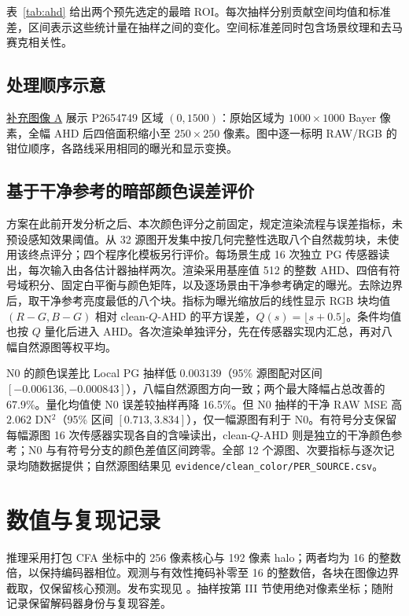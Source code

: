 \documentclass[10pt,twocolumn,journal]{IEEEtran}
\begin{document}
表~\ref{tab:ahd} 给出两个预先选定的最暗 ROI。每次抽样分别贡献空间均值和标准差，区间表示这些统计量在抽样之间的变化。空间标准差同时包含场景纹理和去马赛克相关性。



\subsection{处理顺序示意}
\href{visual_zh.pdf}{补充图像 A} 展示 P2654749 区域 $(0,1500)$：原始区域为 $1000\times1000$ Bayer 像素，全幅 AHD 后四倍面积缩小至 $250\times250$ 像素。图中逐一标明 RAW/RGB 的钳位顺序，各路线采用相同的曝光和显示变换。

\subsection{基于干净参考的暗部颜色误差评价}\label{sec:cleanendpoint}
方案在此前开发分析之后、本次颜色评分之前固定，规定渲染流程与误差指标，未预设感知效果阈值。从 32 源图开发集中按几何完整性选取八个自然裁剪块，未使用该终点评分；四个程序化模板另行评价。每场景生成 16 次独立 PG 传感器读出，每次输入由各估计器抽样两次。渲染采用基座值 512 的整数 AHD、四倍有符号域积分、固定白平衡与颜色矩阵，以及逐场景由干净参考确定的曝光。去除边界后，取干净参考亮度最低的八个块。指标为曝光缩放后的线性显示 RGB 块均值 $(R-G,B-G)$ 相对 clean-$Q$-AHD 的平方误差，$Q(s)=\lfloor s+0.5\rfloor$。条件均值也按 $Q$ 量化后进入 AHD。各次渲染单独评分，先在传感器实现内汇总，再对八幅自然源图等权平均。



N0 的颜色误差比 Local PG 抽样低 $0.003139$（95\% 源图配对区间 $[-0.006136,-0.000843]$），八幅自然源图方向一致；两个最大降幅占总改善的 67.9\%。量化均值使 N0 误差较抽样再降 16.5\%。但 N0 抽样的干净 RAW MSE 高 $2.062$ DN$^2$（95\% 区间 $[0.713,3.834]$），仅一幅源图有利于 N0。有符号分支保留每幅源图 16 次传感器实现各自的含噪读出，clean-$Q$-AHD 则是独立的干净颜色参考；N0 与有符号分支的颜色差值区间跨零。全部 12 个源图、次要指标与逐次记录均随数据提供；自然源图结果见 \texttt{evidence/clean\_color/}\allowbreak\texttt{PER\_SOURCE.csv}。

\section{数值与复现记录}
推理采用打包 CFA 坐标中的 256 像素核心与 192 像素 halo；两者均为 16 的整数倍，以保持编码器相位。观测与有效性掩码补零至 16 的整数倍，各块在图像边界截取，仅保留核心预测。发布实现见 。抽样按第 III 节使用绝对像素坐标；随附记录保留解码器身份与复现容差。
\end{document}
